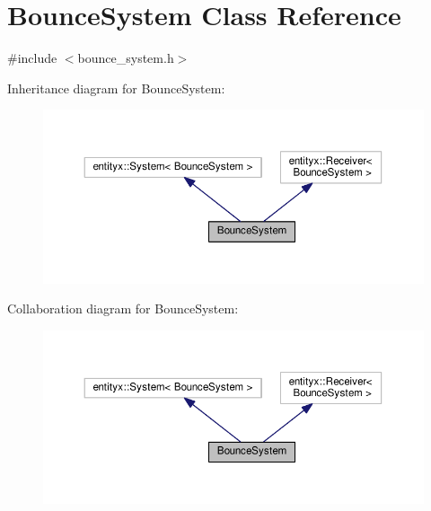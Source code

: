 \hypertarget{classBounceSystem}{}\section{Bounce\+System Class Reference}
\label{classBounceSystem}


{\ttfamily \#include $<$bounce\+\_\+system.\+h$>$}



Inheritance diagram for Bounce\+System\+:
\nopagebreak
\begin{figure}[H]
\begin{center}
\leavevmode
\includegraphics[width=350pt]{classBounceSystem__inherit__graph}
\end{center}
\end{figure}


Collaboration diagram for Bounce\+System\+:
\nopagebreak
\begin{figure}[H]
\begin{center}
\leavevmode
\includegraphics[width=350pt]{classBounceSystem__coll__graph}
\end{center}
\end{figure}
